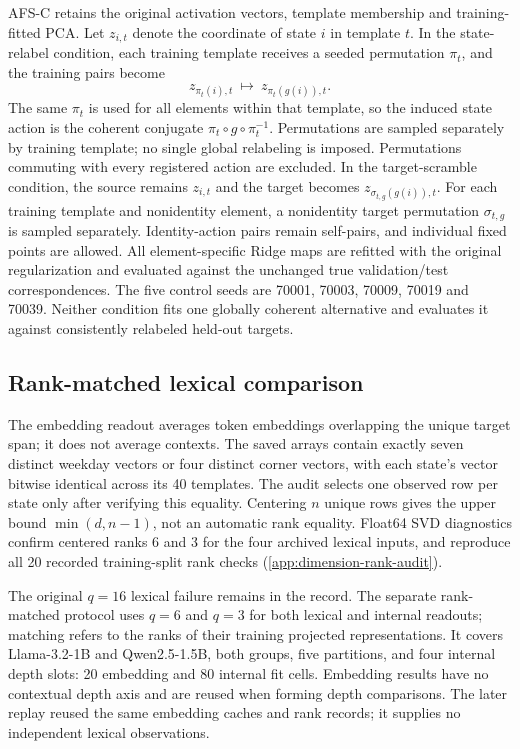AFS-C retains the original activation vectors, template membership and training-fitted PCA. Let $z_{i,t}$ denote the coordinate of state $i$ in template $t$. In the state-relabel condition, each training template receives a seeded permutation $\pi_t$, and the training pairs become
\[
 z_{\pi_t(i),t}\ \longmapsto\ z_{\pi_t(g(i)),t}.
\]
The same $\pi_t$ is used for all elements within that template, so the induced state action is the coherent conjugate $\pi_t\circ g\circ\pi_t^{-1}$. Permutations are sampled separately by training template; no single global relabeling is imposed. Permutations commuting with every registered action are excluded. In the target-scramble condition, the source remains $z_{i,t}$ and the target becomes $z_{\sigma_{t,g}(g(i)),t}$. For each training template and nonidentity element, a nonidentity target permutation $\sigma_{t,g}$ is sampled separately. Identity-action pairs remain self-pairs, and individual fixed points are allowed. All element-specific Ridge maps are refitted with the original regularization and evaluated against the unchanged true validation/test correspondences. The five control seeds are 70001, 70003, 70009, 70019 and 70039. Neither condition fits one globally coherent alternative and evaluates it against consistently relabeled held-out targets.

\subsection{Rank-matched lexical comparison}
\label{app:lexical-rank}
The embedding readout averages token embeddings overlapping the unique target span; it does not average contexts. The saved arrays contain exactly seven distinct weekday vectors or four distinct corner vectors, with each state's vector bitwise identical across its 40 templates. The audit selects one observed row per state only after verifying this equality. Centering $n$ unique rows gives the upper bound $\min(d,n-1)$, not an automatic rank equality. Float64 SVD diagnostics confirm centered ranks 6 and 3 for the four archived lexical inputs, and reproduce all 20 recorded training-split rank checks (\cref{app:dimension-rank-audit}).

The original $q=16$ lexical failure remains in the record. The separate rank-matched protocol uses $q=6$ and $q=3$ for both lexical and internal readouts; matching refers to the ranks of their training projected representations. It covers Llama-3.2-1B and Qwen2.5-1.5B, both groups, five partitions, and four internal depth slots: 20 embedding and 80 internal fit cells. Embedding results have no contextual depth axis and are reused when forming depth comparisons. The later replay reused the same embedding caches and rank records; it supplies no independent lexical observations.

